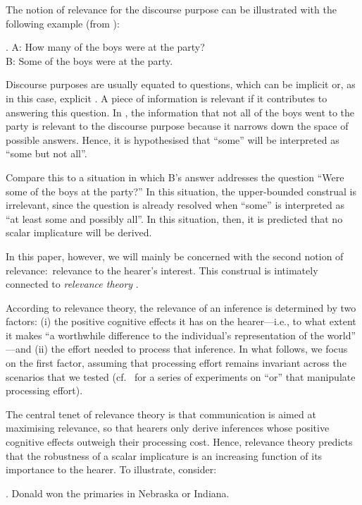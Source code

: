 \documentclass[12pt]{article}
\begin{document}
The notion of relevance for the discourse purpose can be illustrated with the following example (from \citealt{kuppevelt1996}):

\ex.	A: How many of the boys were at the party? \\ B: Some of the boys were at the party.

Discourse purposes are usually equated to questions, which can be implicit or, as in this case, explicit \citep{roberts2012}. A piece of information is relevant if it contributes to answering this question. In \Last, the information that not all of the boys went to the party is relevant to the discourse purpose because it narrows down the space of possible answers. Hence, it is hypothesised that ``some'' will be interpreted as ``some but not all''. 

Compare this to a situation in which B's answer addresses the question ``Were some of the boys at the party?'' In this situation, the upper-bounded construal is irrelevant, since the question is already resolved when ``some'' is interpreted as ``at least some and possibly all''. In this situation, then, it is predicted that no scalar implicature will be derived.

In this paper, however, we will mainly be concerned with the second notion of relevance:\ relevance to the hearer's interest. This construal is intimately connected to \emph{relevance theory} \citep{sperber1995}.

According to relevance theory, the relevance of an inference is determined by two factors: (i) the positive cognitive effects it has on the hearer---i.e., to what extent it makes ``a worthwhile difference to the individual's representation of the world'' \citep[p.\ 251]{wilson2002}---and (ii) the effort needed to process that inference. In what follows, we focus on the first factor, assuming that processing effort remains invariant across the scenarios that we tested (cf.\ \citealt{chevallier2008} for a series of experiments on ``or'' that manipulate processing effort). 

The central tenet of relevance theory is that communication is aimed at maximising relevance, so that hearers only derive inferences whose positive cognitive effects outweigh their processing cost. Hence, relevance theory predicts that the robustness of a scalar implicature is an increasing function of its importance to the hearer. To illustrate, consider:

\ex.	Donald won the primaries in Nebraska or Indiana.
\end{document}

